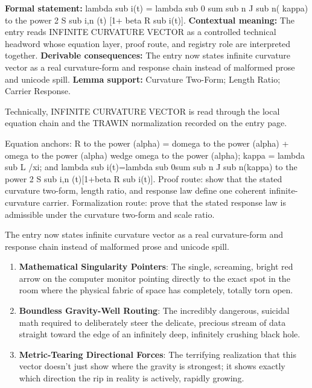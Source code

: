 \begingroup\footnotesize\setlength{\emergencystretch}{3em}\sloppy
\textbf{Formal statement:} lambda sub i(t) = lambda sub 0 sum sub n J sub n( kappa) to the power 2 S sub i,n (t) [1+ beta R sub i(t)]. \textbf{Contextual meaning:} The entry reads INFINITE CURVATURE VECTOR as a controlled technical headword whose equation layer, proof route, and registry role are interpreted together. \textbf{Derivable consequences:} The entry now states infinite curvature vector as a real curvature-form and response chain instead of malformed prose and unicode spill. \textbf{Lemma support:} Curvature Two-Form; Length Ratio; Carrier Response.\par
\endgroup

Technically, INFINITE CURVATURE VECTOR is read through the local equation chain and the TRAWIN normalization recorded on the entry page.

Equation anchors: R to the power (alpha) = domega to the power (alpha) + omega to the power (alpha) wedge omega to the power (alpha); kappa = lambda sub L /xi; and lambda sub i(t)=lambda sub 0sum sub n J sub n(kappa) to the power 2 S sub i,n (t)[1+beta R sub i(t)]. Proof route: show that the stated curvature two-form, length ratio, and response law define one coherent infinite-curvature carrier. Formalization route: prove that the stated response law is admissible under the curvature two-form and scale ratio.

The entry now states infinite curvature vector as a real curvature-form and response chain instead of malformed prose and unicode spill.
\endgroup

\begin{enumerate}[leftmargin=1.6em,itemsep=6pt,topsep=4pt]
\item \textbf{Mathematical Singularity Pointers}: The single, screaming, bright red arrow on the computer monitor pointing directly to the exact spot in the room where the physical fabric of space has completely, totally torn open.
\item \textbf{Boundless Gravity-Well Routing}: The incredibly dangerous, suicidal math required to deliberately steer the delicate, precious stream of data straight toward the edge of an infinitely deep, infinitely crushing black hole.
\item \textbf{Metric-Tearing Directional Forces}: The terrifying realization that this vector doesn't just show where the gravity is strongest; it shows exactly which direction the rip in reality is actively, rapidly growing.
\end{enumerate}

